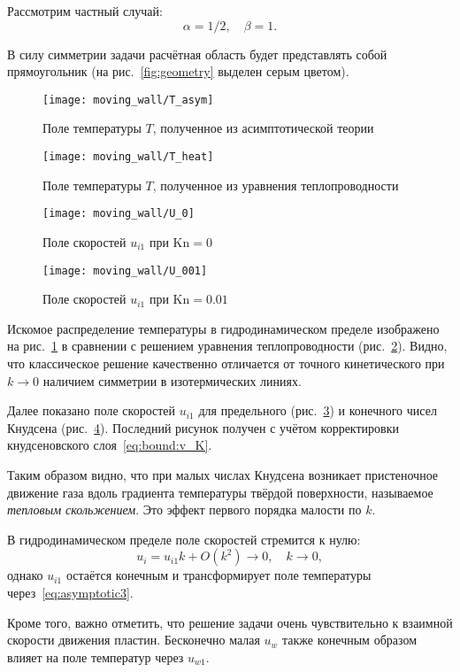 \documentclass[english,russian,a4paper,10pt]{article}
\newcommand{\Kn}{\mathrm{Kn}}
\begin{document}
Рассмотрим частный случай:
\[\alpha=1/2, \quad \beta = 1. \]

В силу симметрии задачи расчётная область будет представлять собой прямоугольник
(на рис.~\ref{fig:geometry} выделен серым цветом).

\begin{figure}[ht]
	\centering
	\texttt{[image: moving\_wall/T\_asym]}
	\caption{Поле температуры \(T\), полученное из асимптотической теории}
	\label{fig:moving:T_asym}
\end{figure}

\begin{figure}[ht]
	\centering
	\texttt{[image: moving\_wall/T\_heat]}
	\caption{Поле температуры \(T\), полученное из уравнения теплопроводности}
	\label{fig:moving:T_heat}
\end{figure}

\begin{figure}[ht]
	\centering
	\texttt{[image: moving\_wall/U\_0]}
	\caption{Поле скоростей \(u_{i1}\) при \(\Kn=0\)}\label{fig:moving:fluid}
\end{figure}

\begin{figure}[ht]
	\centering
	\texttt{[image: moving\_wall/U\_001]}
	\caption{Поле скоростей \(u_{i1}\) при \(\Kn=0.01\) }\label{fig:moving:kn001}
\end{figure}

Искомое распределение температуры в гидродинамическом пределе изображено
на рис.~\ref{fig:moving:T_asym} в сравнении с решением уравнения теплопроводности (рис.~\ref{fig:moving:T_heat}).
Видно, что классическое решение качественно отличается от точного кинетического при \(k\to0\)
наличием симметрии в изотермических линиях.

Далее показано поле скоростей \(u_{i1}\) для предельного (рис.~\ref{fig:moving:fluid})
и конечного чисел Кнудсена (рис.~\ref{fig:moving:kn001}).
Последний рисунок получен с учётом корректировки кнудсеновского слоя~\eqref{eq:bound:v_K}.

Таким образом видно, что при малых числах Кнудсена возникает пристеночное движение газа
вдоль градиента температуры твёрдой поверхности, называемое \textit{тепловым скольжением}.
Это эффект первого порядка малости по \(k\).

В гидродинамическом пределе поле скоростей стремится к нулю:
\[ u_i = u_{i1}k + O(k^2) \to 0, \quad k\to0,\]
однако \(u_{i1}\) остаётся конечным и трансформирует поле температуры через~\eqref{eq:asymptotic3}.

Кроме того, важно отметить, что решение задачи очень чувствительно к взаимной скорости движения пластин.
Бесконечно малая \(u_w\) также конечным образом влияет на поле температур через \(u_{w1}\).
\end{document}
